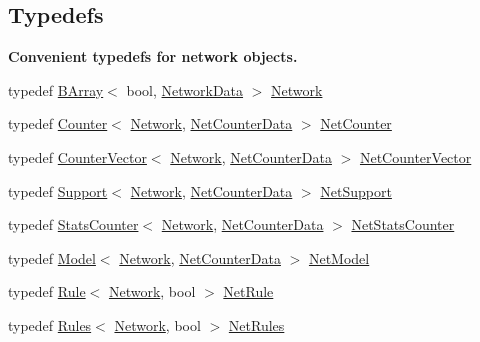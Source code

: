 \subsection*{Typedefs}
\begin{Indent}\textbf{ Convenient typedefs for network objects.}\par
\begin{DoxyCompactItemize}
\item 
typedef \hyperlink{classbarry_1_1_b_array}{B\+Array}$<$ bool, \hyperlink{classbarry_1_1counters_1_1network_1_1_network_data}{Network\+Data} $>$ \hyperlink{namespacebarry_1_1counters_1_1network_a4cb88d4572ded3b447ea269c9cd0b2c0}{Network}
\item 
typedef \hyperlink{classbarry_1_1_counter}{Counter}$<$ \hyperlink{namespacebarry_1_1counters_1_1network_a4cb88d4572ded3b447ea269c9cd0b2c0}{Network}, \hyperlink{classbarry_1_1counters_1_1network_1_1_net_counter_data}{Net\+Counter\+Data} $>$ \hyperlink{namespacebarry_1_1counters_1_1network_a067bd9de04608fc2e1586324d3864a45}{Net\+Counter}
\item 
typedef \hyperlink{classbarry_1_1_counter_vector}{Counter\+Vector}$<$ \hyperlink{namespacebarry_1_1counters_1_1network_a4cb88d4572ded3b447ea269c9cd0b2c0}{Network}, \hyperlink{classbarry_1_1counters_1_1network_1_1_net_counter_data}{Net\+Counter\+Data} $>$ \hyperlink{namespacebarry_1_1counters_1_1network_a3b3c590303d47840d1967372ae495d95}{Net\+Counter\+Vector}
\item 
typedef \hyperlink{classbarry_1_1_support}{Support}$<$ \hyperlink{namespacebarry_1_1counters_1_1network_a4cb88d4572ded3b447ea269c9cd0b2c0}{Network}, \hyperlink{classbarry_1_1counters_1_1network_1_1_net_counter_data}{Net\+Counter\+Data} $>$ \hyperlink{namespacebarry_1_1counters_1_1network_a4d30be7f465efd7d218f0264f8386b32}{Net\+Support}
\item 
typedef \hyperlink{classbarry_1_1_stats_counter}{Stats\+Counter}$<$ \hyperlink{namespacebarry_1_1counters_1_1network_a4cb88d4572ded3b447ea269c9cd0b2c0}{Network}, \hyperlink{classbarry_1_1counters_1_1network_1_1_net_counter_data}{Net\+Counter\+Data} $>$ \hyperlink{namespacebarry_1_1counters_1_1network_ae26c399917113fe280b3f2859376b8b9}{Net\+Stats\+Counter}
\item 
typedef \hyperlink{classbarry_1_1_model}{Model}$<$ \hyperlink{namespacebarry_1_1counters_1_1network_a4cb88d4572ded3b447ea269c9cd0b2c0}{Network}, \hyperlink{classbarry_1_1counters_1_1network_1_1_net_counter_data}{Net\+Counter\+Data} $>$ \hyperlink{namespacebarry_1_1counters_1_1network_a3ab1ee0750d4a5b0f92253874e055358}{Net\+Model}
\item 
typedef \hyperlink{classbarry_1_1_rule}{Rule}$<$ \hyperlink{namespacebarry_1_1counters_1_1network_a4cb88d4572ded3b447ea269c9cd0b2c0}{Network}, bool $>$ \hyperlink{namespacebarry_1_1counters_1_1network_afbd2c2a61931e69dd5f668c421e87a6f}{Net\+Rule}
\item 
typedef \hyperlink{classbarry_1_1_rules}{Rules}$<$ \hyperlink{namespacebarry_1_1counters_1_1network_a4cb88d4572ded3b447ea269c9cd0b2c0}{Network}, bool $>$ \hyperlink{namespacebarry_1_1counters_1_1network_adbdb20b3ce883777da2364984ea10c56}{Net\+Rules}
\end{DoxyCompactItemize}
\end{Indent}
